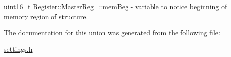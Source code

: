\mbox{\label{unionRegister_1_1MasterReg___a1753a4e5fb7c7ea404794200f06844d0}} 
{\footnotesize\ttfamily \mbox{\hyperlink{settings_8h_a017dd44e68049ffdd31500a8cd01ba68}{uint16\+\_\+t}} Register\+::\+Master\+Reg\+\_\+\+::\texorpdfstring{mem\+Beg}{memBeg}} - variable to notice beginning of memory region of structure.



The documentation for this union was generated from the following file\+:\begin{DoxyCompactItemize}
\item 
\mbox{\hyperlink{settings_8h}{settings.\+h}}\end{DoxyCompactItemize}
\newpage